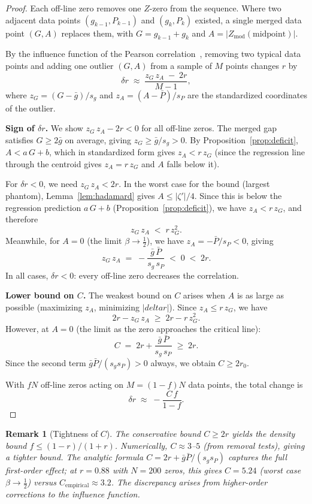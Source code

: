 \documentclass[11pt,a4paper]{article}
\newtheorem{remark}[theorem]{Remark}
\begin{document}
\begin{proof}
Each off-line zero removes one $Z$-zero from the sequence.
Where two adjacent data points $(g_{k-1}, P_{k-1})$ and $(g_k, P_k)$ existed, a single merged data point $(G, A)$ replaces them, with $G = g_{k-1} + g_k$ and $A = |Z_{\mathrm{mod}}(\text{midpoint})|$.

By the influence function of the Pearson correlation~\cite{CookWeisberg1982}, removing two typical data points and adding one outlier $(G, A)$ from a sample of $M$ points changes $r$ by
\begin{equation}\label{eq:influence}
\delta r \;\approx\; \frac{z_G \, z_A \;-\; 2r}{M - 1},
\end{equation}
where $z_G = (G - \bar{g})/s_g$ and $z_A = (A - \bar{P})/s_P$ are the standardized coordinates of the outlier.

\textbf{Sign of $\delta r$.}
We show $z_G \, z_A - 2r < 0$ for all off-line zeros.
The merged gap satisfies $G \geq 2\bar{g}$ on average, giving $z_G \geq \bar{g}/s_g > 0$.
By Proposition~\ref{prop:deficit}, $A < a\,G + b$, which in standardized form gives $z_A < r\,z_G$ (since the regression line through the centroid gives $z_A = r\,z_G$ and $A$ falls below it).

For $\delta r < 0$, we need $z_G \, z_A < 2r$.
In the worst case for the bound (largest phantom), Lemma~\ref{lem:hadamard} gives $A \leq |\zeta'|/4$.
Since this is below the regression prediction $a\,G + b$ (Proposition~\ref{prop:deficit}), we have $z_A < r\,z_G$, and therefore
\[
z_G\,z_A \;<\; r\,z_G^2.
\]
Meanwhile, for $A = 0$ (the limit $\beta \to \frac{1}{2}$), we have $z_A = -\bar{P}/s_P < 0$, giving
\[
z_G\,z_A \;=\; -\frac{\bar{g}\,\bar{P}}{s_g\,s_P} \;<\; 0 \;<\; 2r.
\]
In all cases, $\delta r < 0$: every off-line zero decreases the correlation.

\textbf{Lower bound on $C$.}
The weakest bound on $C$ arises when $A$ is as large as possible (maximizing $z_A$, minimizing $|delta r|$).
Since $z_A \leq r\,z_G$, we have
\[
2r - z_G\,z_A \;\geq\; 2r - r\,z_G^2.
\]
However, at $A = 0$ (the limit as the zero approaches the critical line):
\[
C \;=\; 2r + \frac{\bar{g}\,\bar{P}}{s_g\,s_P} \;\geq\; 2r.
\]
Since the second term $\bar{g}\bar{P}/(s_g s_P) > 0$ always, we obtain $C \geq 2r_0$.

With $fN$ off-line zeros acting on $M = (1-f)N$ data points, the total change is
\[
\delta r \;\approx\; -\frac{C\,f}{1 - f}.
\]
\end{proof}

\begin{remark}[Tightness of $C$]
The conservative bound $C \geq 2r$ yields the density bound $f \leq (1-r)/(1+r)$.
Numerically, $C \approx 3$--$5$ (from removal tests), giving a tighter bound.
The analytic formula $C = 2r + \bar{g}\bar{P}/(s_g s_P)$ captures the full first-order effect; at $r = 0.88$ with $N = 200$ zeros, this gives $C = 5.24$ (worst case $\beta \to \frac{1}{2}$) versus $C_{\mathrm{empirical}} \approx 3.2$.
The discrepancy arises from higher-order corrections to the influence function.
\end{remark}
\end{document}
